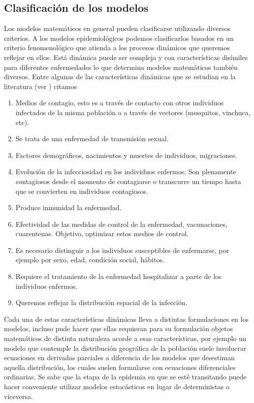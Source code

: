 \documentclass{article}
\begin{document}
 

\subsection{Clasificación de los modelos} \label{clasif}

Los modelos matemáticos en general  pueden clasificarse utilizando diversos criterios. A los modelos epidemiológicos podemos clasificarlos basados en un criterio fenomenológico que atienda a los procesos dinámicos que queremos reflejar en ellos. Está dinámica puede ser compleja y con características disímiles para diferentes enfermedades lo que determina modelos matemáticos también diversos. Entre algunas de las características dinámicas que se  estudian en la literatura (ver \cite{FredBrauer}) citamos

\begin{enumerate}
 \item Medios de contagio, esto es a través de contacto con otros individuos infectados de la misma población o a través de vectores (mosquitos, vinchuca, etc).
 \item   Se trata de una enfermedad de transmisión sexual.
 \item Factores demográficos, nacimientos y muertes de individuos, migraciones.
 \item Evolución de la infecciosidad en los individuos enfermos.  Son plenamente contagiosos desde el momento de contagiarse o transcurre un tiempo hasta que se convierten en individuos contagiosos.
 \item Produce inmunidad la enfermedad.
 \item Efectividad  de las medidas de control de la enfermedad, vacunaciones, cuarentenas. Objetivo, optimizar estos medios de control.
 \item Es necesario distinguir  a los individuos susceptibles de enfermarse, por ejemplo por sexo, edad, condición social, hábitos.
 \item Requiere el tratamiento de la enfermedad hospitalizar a parte de  los individuos enfermos.
 \item Queremos reflejar la distribución espacial de la infección.
 
 \end{enumerate}
 
 Cada una de estas características dinámicas lleva a distintas formulaciones en los  modelos, incluso pude hacer que ellas requieran para su formulación objetos matemáticos de distinta naturaleza  acorde a esas características, por ejemplo un modelo que contemple la distribución geográfica de la población suele involucrar ecuaciones en derivadas parciales a diferencia de los modelos que desestiman aquella distribución, los cuales suelen formularse con ecuaciones diferenciales ordinarias. Se sabe que la etapa de la epidemia en que se esté transitando puede hacer conveniente utilizar modelos estocásticos en lugar de deterministas o viceversa.
 
\end{document}
